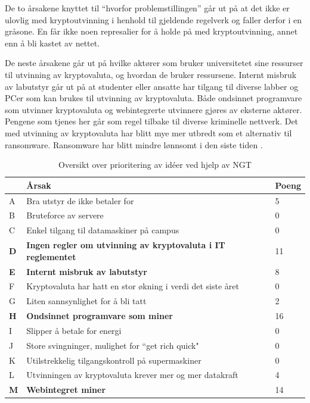 De to årsakene knyttet til ``hvorfor problemstillingen'' går ut på at det ikke er ulovlig med kryptoutvinning i henhold til gjeldende regelverk og faller derfor i en gråsone. En får ikke noen represalier for å holde på med kryptoutvinning, annet enn å bli kastet av nettet.

De neste årsakene går ut på hvilke aktører som bruker universitetet sine ressurser til utvinning av kryptovaluta, og hvordan de bruker ressursene. Internt misbruk av labutstyr går ut på at studenter eller ansatte har tilgang til diverse labber og PCer som kan brukes til utvinning av kryptovaluta. Både ondsinnet programvare som utvinner kryptovaluta og webintegrerte utvinnere gjøres av eksterne aktører. Pengene som tjenes her går som regel tilbake til diverse kriminelle nettverk. Det med utvinning av kryptovaluta har blitt mye mer utbredt som et alternativ til ransomware. Ransomware har blitt mindre lønnsomt i den siste tiden \cite{RW}.

\begin{table} [H]
    \begin{tabular}{ | m{2em} | m{30em} | m{3em} | }
        \hline
            \cellcolor{yellow}  & \cellcolor{yellow} \textbf{Årsak} & \cellcolor{yellow} Poeng \\
        \hline
           A& Bra utstyr de ikke betaler for & 5 \\
        \hline
          B & Bruteforce av servere & 0 \\
        \hline
          C & Enkel tilgang til datamaskiner på campus & 0 \\
        \hline
         \textbf{D} & \textbf{Ingen regler om utvinning av kryptovaluta i IT reglementet} & 11 \\
        \hline
          \textbf{E} & \textbf{Internt misbruk av labutstyr} & 8  \\
        \hline
          F & Kryptovaluta har hatt en stor økning i verdi det siste året & 0 \\
        \hline
         G & Liten sannsynlighet for å bli tatt & 2 \\
        \hline
         \textbf{H} & \textbf{Ondsinnet programvare som miner} &  16 \\
        \hline
         I & Slipper å betale for energi & 0 \\
        \hline
         J & Store svingninger, mulighet for “get rich quick" & 0 \\
        \hline
         K & Utilstrekkelig tilgangskontroll på supermaskiner & 0 \\
        \hline
         L & Utvinningen av kryptovaluta krever mer og mer datakraft & 4 \\
        \hline
         \textbf{M} & \textbf{Webintegret miner} & 14 \\
        \hline
    \end{tabular}
    \caption{Oversikt over prioritering av idéer ved hjelp av NGT}
    \label{tab:NGT}
\end{table}

